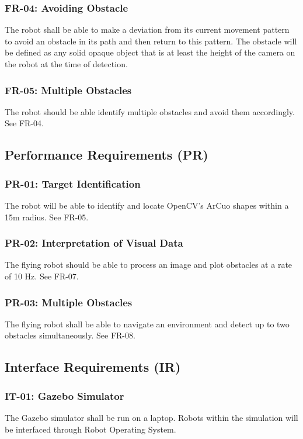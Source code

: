 \documentclass{article}
\begin{document}
		\subsubsection{FR-04: Avoiding Obstacle}
		The robot shall be able to make a deviation from its current movement pattern to avoid an obstacle in its path and then return to this pattern. The obstacle will be defined as any solid opaque object that is at least the height of the camera on the robot at the time of detection.
		
		\subsubsection{FR-05: Multiple Obstacles}
		The robot should be able identify multiple obstacles and avoid them accordingly. See FR-04. 
		
	\subsection{Performance Requirements (PR)}
	
		\subsubsection{PR-01: Target Identification}
		
		The robot will be able to identify and locate OpenCV's ArCuo shapes within a 15m radius. See FR-05.
		
		\subsubsection{PR-02: Interpretation of Visual Data}
		
		The flying robot should be able to process an image and plot obstacles at a rate of 10 Hz. See FR-07.
		
		\subsubsection{PR-03: Multiple Obstacles}
		
		The flying robot shall be able to navigate an environment and detect up to two obstacles simultaneously. See FR-08.
		
	\subsection{Interface Requirements (IR)}

		\subsubsection{IT-01: Gazebo Simulator}
		The Gazebo simulator shall be run on a laptop. Robots within the simulation will be interfaced through Robot Operating System.
	
\end{document}
